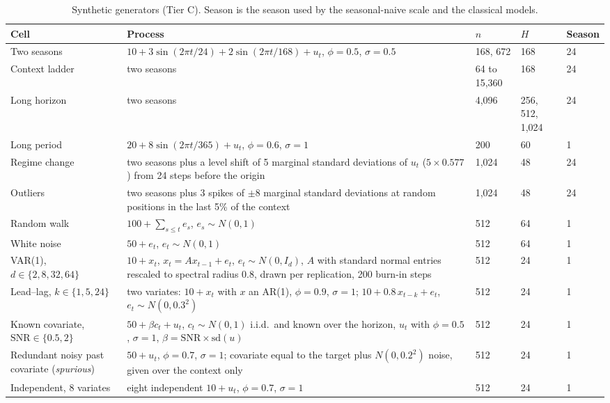 \begin{table}[!htbp]
\centering
\caption{Synthetic generators (Tier C). Season is the season used by the seasonal-naive scale and the classical models.}
\label{tab:generators}
\scriptsize
\setlength{\tabcolsep}{3pt}
\begin{tabular}{>{\raggedright\arraybackslash}p{2.8cm}>{\raggedright\arraybackslash}p{7.7cm}lll}
\toprule
Cell & Process & $n$ & $H$ & Season \\
\midrule
Two seasons & $10 + 3\sin(2\pi t/24) + 2\sin(2\pi t/168) + u_t$, $\phi = 0.5$, $\sigma = 0.5$ & 168, 672 & 168 & 24 \\
Context ladder & two seasons & 64 to 15{,}360 & 168 & 24 \\
Long horizon & two seasons & 4{,}096 & 256, 512, 1{,}024 & 24 \\
Long period & $20 + 8\sin(2\pi t/365) + u_t$, $\phi = 0.6$, $\sigma = 1$ & 200 & 60 & 1 \\
Regime change & two seasons plus a level shift of 5 marginal standard deviations of $u_t$ ($5 \times 0.577$) from 24 steps
before the origin & 1{,}024 & 48 & 24 \\
Outliers & two seasons plus 3 spikes of $\pm 8$ marginal standard deviations at random positions in the last 5\% of the context
& 1{,}024 & 48 & 24 \\
Random walk & $100 + \sum_{s \le t} e_s$, $e_s \sim N(0, 1)$ & 512 & 64 & 1 \\
White noise & $50 + e_t$, $e_t \sim N(0, 1)$ & 512 & 64 & 1 \\
VAR(1), $d \in \{2, 8, 32, 64\}$ & $10 + x_t$, $x_t = A x_{t-1} + e_t$, $e_t \sim N(0, I_d)$, $A$ with standard normal entries rescaled
to spectral radius 0.8, drawn per replication, 200 burn-in steps & 512 & 24 & 1 \\
Lead--lag, $k \in \{1, 5, 24\}$ & two variates: $10 + x_t$ with $x$ an AR(1), $\phi = 0.9$, $\sigma = 1$; $10 + 0.8\,x_{t-k} + e_t$,
$e_t \sim N(0, 0.3^2)$ & 512 & 24 & 1 \\
Known covariate, $\mathrm{SNR} \in \{0.5, 2\}$ & $50 + \beta c_t + u_t$, $c_t \sim N(0, 1)$ i.i.d.\ and known over the horizon, $u_t$ with
$\phi = 0.5$, $\sigma = 1$, $\beta = \mathrm{SNR} \times \mathrm{sd}(u)$ & 512 & 24 & 1 \\
Redundant noisy past covariate (\emph{spurious}) & $50 + u_t$, $\phi = 0.7$, $\sigma = 1$; covariate equal to the target plus $N(0, 0.2^2)$ noise, given
over the context only & 512 & 24 & 1 \\
Independent, 8 variates & eight independent $10 + u_t$, $\phi = 0.7$, $\sigma = 1$ & 512 & 24 & 1 \\

\end{tabular}
\end{table}
